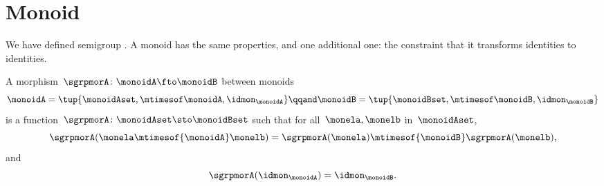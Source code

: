 \section{Monoid \whomos}
We have defined semigroup \whomo.
A monoid \whomo has the same properties, and one additional one: the constraint that it transforms identities to identities.

\begin{ctdefinition}
	\label{def:monoid-mor}
	A morphism~$\sgrpmorA\colon \monoidA \fto \monoidB$ between monoids
	\begin{equation}
		\monoidA = \tup{\monoidAset, \mtimesof\monoidA, \idmon_\monoidA}
		\qqand
		\monoidB = \tup{\monoidBset, \mtimesof\monoidB, \idmon_\monoidB}
	\end{equation}
	is a function~$\sgrpmorA \colon \monoidAset \sto \monoidBset$ such that for all~$\monela, \monelb$ in~$\monoidAset$,
	\begin{equation}
		\label{eq:mon-mor-comp}
		\sgrpmorA (\monela \mtimesof{\monoidA} \monelb) = \sgrpmorA (\monela) \mtimesof{\monoidB}  \sgrpmorA(\monelb),
	\end{equation}
	and
	\begin{equation}
		\label{eq:mon-id-comp}
		\sgrpmorA (\idmon_\monoidA) = \idmon_{\monoidB}.
	\end{equation}
\end{ctdefinition}
